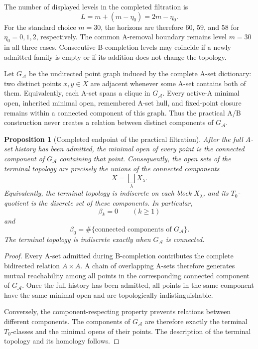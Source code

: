 \documentclass[a4paper,11pt]{article}
\newtheorem{proposition}[proposition]{Proposition}
\theoremstyle{definition}
\theoremstyle{remark}
\begin{document}
The number of displayed levels in the completed filtration is
$$
L = m+(m-\eta_0) = 2m-\eta_0.
$$
For the standard choice $m=30$, the horizons are therefore $60$, $59$, and $58$ for $\eta_0=0,1,2$, respectively. The common A-removal boundary remains level $m=30$ in all three cases. Consecutive B-completion levels may coincide if a newly admitted family is empty or if its addition does not change the topology.

Let $G_{\mathcal A}$ be the undirected point graph induced by the complete A-set dictionary: two distinct points $x,y\in X$ are adjacent whenever some A-set contains both of them. Equivalently, each A-set spans a clique in $G_{\mathcal A}$. Every active-A minimal open, inherited minimal open, remembered A-set hull, and fixed-point closure remains within a connected component of this graph. Thus the practical A/B construction never creates a relation between distinct components of $G_{\mathcal A}$.

\begin{proposition}[Completed endpoint of the practical filtration]
\label{prop:practical-b-completion-endpoint}
After the full A-set history has been admitted, the minimal open of every point is the connected component of $G_{\mathcal A}$ containing that point. Consequently, the open sets of the terminal topology are precisely the unions of the connected components
$$
X=\bigsqcup_{\lambda}X_\lambda.
$$
Equivalently, the terminal topology is indiscrete on each block $X_\lambda$, and its $T_0$-quotient is the discrete set of these components. In particular,
$$
\beta_k=0\qquad(k\geq1)
$$
and
$$
\beta_0 = \#\{\text{connected components of }G_{\mathcal A}\}.
$$
The terminal topology is indiscrete exactly when $G_{\mathcal A}$ is connected.
\end{proposition}

\begin{proof}
Every A-set admitted during B-completion contributes the complete bidirected relation $A\times A$. A chain of overlapping A-sets therefore generates mutual reachability among all points in the corresponding connected component of $G_{\mathcal A}$. Once the full history has been admitted, all points in the same component have the same minimal open and are topologically indistinguishable.

Conversely, the component-respecting property prevents relations between different components. The components of $G_{\mathcal A}$ are therefore exactly the terminal $T_0$-classes and the minimal opens of their points. The description of the terminal topology and its homology follows.
\end{proof}
\end{document}
